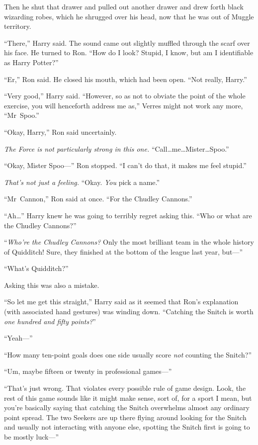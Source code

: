 Then he shut that drawer and pulled out another drawer and drew forth black wizarding robes, which he shrugged over his head, now that he was out of Muggle territory.

“There,” Harry said. The sound came out slightly muffled through the scarf over his face. He turned to Ron. “How do I look? Stupid, I know, but am I identifiable as Harry Potter?”

“Er,” Ron said. He closed his mouth, which had been open. “Not really, Harry.”

“Very good,” Harry said. “However, so as not to obviate the point of the whole exercise, you will henceforth address me as,” Verres might not work any more, “Mr~Spoo.”

“Okay, Harry,” Ron said uncertainly.

\emph{The Force is not particularly strong in this one.} “Call…me…Mister…Spoo.”

“Okay, Mister Spoo—” Ron stopped. “I can’t do that, it makes me feel stupid.”

\emph{That’s not just a feeling.} “Okay. \emph{You} pick a name.”

“Mr~Cannon,” Ron said at once. “For the Chudley Cannons.”

“Ah…” Harry knew he was going to terribly regret asking this. “Who or what are the Chudley Cannons?”

“\emph{Who’re the Chudley Cannons?} Only the most brilliant team in the whole history of Quidditch! Sure, they finished at the bottom of the league last year, but—”

“What’s Quidditch?”

Asking this was also a mistake.

“So let me get this straight,” Harry said as it seemed that Ron’s explanation (with associated hand gestures) was winding down. “Catching the Snitch is worth \emph{one hundred and fifty points?}”

“Yeah—”

“How many ten-point goals does one side usually score \emph{not} counting the Snitch?”

“Um, maybe fifteen or twenty in professional games—”

“That’s just wrong. That violates every possible rule of game design. Look, the rest of this game sounds like it might make sense, sort of, for a sport I mean, but you’re basically saying that catching the Snitch overwhelms almost any ordinary point spread. The two Seekers are up there flying around looking for the Snitch and usually not interacting with anyone else, spotting the Snitch first is going to be mostly luck—”

